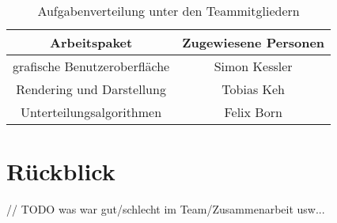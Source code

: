 \begin{table}
\caption{Aufgabenverteilung unter den Teammitgliedern}
\center
\begin{tabular}{c|c}
Arbeitspaket & Zugewiesene Personen\\
\hline
grafische Benutzeroberfläche & Simon Kessler \\
Rendering und Darstellung & Tobias Keh \\
Unterteilungsalgorithmen & Felix Born \\
\end{tabular}
\label{tab:aufgabenverteilung}
\end{table}



\section{Rückblick}

// TODO was war gut/schlecht im Team/Zusammenarbeit usw...
